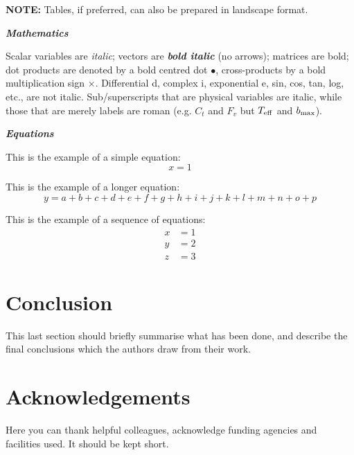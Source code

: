 \documentclass[arxiv,usenatbib]{iupartex}
\newcommand{\textbit}[1]{\textbf{\textit{#1}}}
\newcommand{\inspace}[1]{\vspace*{#1}\noindent}
\begin{document}
\inspace{2mm}%
\textbf{NOTE:} Tables, if preferred, can also be prepared in landscape format.

\inspace{6mm}%
\textbit{Mathematics}

\noindent Scalar variables are \textit{italic}; vectors are \textbit{bold italic} (no arrows); matrices are bold; dot products are denoted by a bold centred dot $\bullet$, cross-products by a bold multiplication sign $\times$. Differential d, complex i, exponential e, sin, cos, tan, log, etc., are not italic. Sub/superscripts that are physical variables are italic, while those that are merely labels are roman (e.g. $C_t$ and $F_v$ but $T_{\rm eff}$ and $b_{\rm max}$). 

\inspace{7mm}%
\textbit{Equations}

\inspace{3mm}%
This is the example of a simple equation:
\begin{equation}
	x=1
\end{equation}

\inspace{3mm}
This is the example of a longer equation:
\begin{equation}
	y=a+b+c+d+e+f+g+h+i+j+k+l+m+n+o+p
\end{equation}

\inspace{3mm}%
This is the example of a sequence of equations:
\begin{equation}
	\begin{aligned}
		x &= 1 \\
		y &= 2 \\
		z &= 3
	\end{aligned}
\end{equation}

\section{Conclusion}
This last section should brieﬂy summarise what has been done, and describe the ﬁnal conclusions which the authors draw from their work.

\section*{Acknowledgements}
Here you can thank helpful colleagues, acknowledge funding agencies and facilities used. It should be kept short.


%
\end{document}
